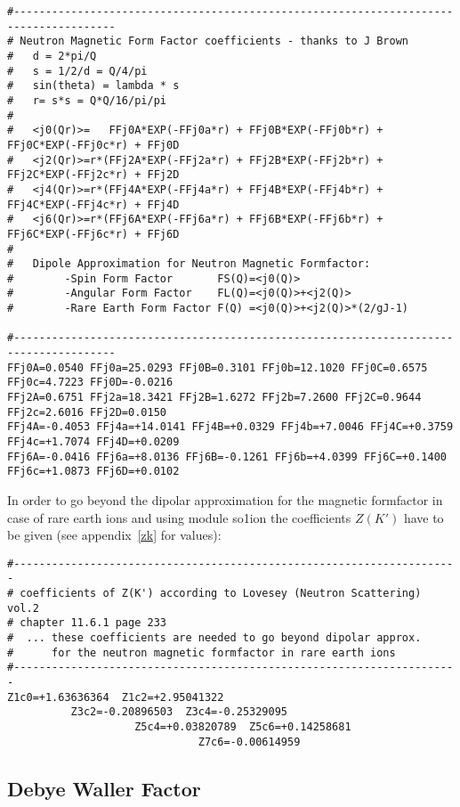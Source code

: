 {\footnotesize
\begin{verbatim}
#--------------------------------------------------------------------------------------
# Neutron Magnetic Form Factor coefficients - thanks to J Brown
#   d = 2*pi/Q      
#   s = 1/2/d = Q/4/pi   
#   sin(theta) = lambda * s
#   r= s*s = Q*Q/16/pi/pi
#
#   <j0(Qr)>=   FFj0A*EXP(-FFj0a*r) + FFj0B*EXP(-FFj0b*r) + FFj0C*EXP(-FFj0c*r) + FFj0D
#   <j2(Qr)>=r*(FFj2A*EXP(-FFj2a*r) + FFj2B*EXP(-FFj2b*r) + FFj2C*EXP(-FFj2c*r) + FFj2D
#   <j4(Qr)>=r*(FFj4A*EXP(-FFj4a*r) + FFj4B*EXP(-FFj4b*r) + FFj4C*EXP(-FFj4c*r) + FFj4D
#   <j6(Qr)>=r*(FFj6A*EXP(-FFj6a*r) + FFj6B*EXP(-FFj6b*r) + FFj6C*EXP(-FFj6c*r) + FFj6D
#
#   Dipole Approximation for Neutron Magnetic Formfactor:
#        -Spin Form Factor       FS(Q)=<j0(Q)>
#        -Angular Form Factor    FL(Q)=<j0(Q)>+<j2(Q)>
#        -Rare Earth Form Factor F(Q) =<j0(Q)>+<j2(Q)>*(2/gJ-1)

#--------------------------------------------------------------------------------------
FFj0A=0.0540 FFj0a=25.0293 FFj0B=0.3101 FFj0b=12.1020 FFj0C=0.6575 FFj0c=4.7223 FFj0D=-0.0216
FFj2A=0.6751 FFj2a=18.3421 FFj2B=1.6272 FFj2b=7.2600 FFj2C=0.9644 FFj2c=2.6016 FFj2D=0.0150
FFj4A=-0.4053 FFj4a=+14.0141 FFj4B=+0.0329 FFj4b=+7.0046 FFj4C=+0.3759 FFj4c=+1.7074 FFj4D=+0.0209
FFj6A=-0.0416 FFj6a=+8.0136 FFj6B=-0.1261 FFj6b=+4.0399 FFj6C=+0.1400 FFj6c=+1.0873 FFj6D=+0.0102
\end{verbatim}
}
In order to go beyond the dipolar approximation for the magnetic formfactor in case
of rare earth ions and using module {\prg so1ion} the coefficients $Z(K')$ have to
be given (see appendix~\ref{zk} for values):
{\footnotesize
\begin{verbatim}
#----------------------------------------------------------------------
# coefficients of Z(K') according to Lovesey (Neutron Scattering) vol.2
# chapter 11.6.1 page 233
#  ... these coefficients are needed to go beyond dipolar approx.
#      for the neutron magnetic formfactor in rare earth ions
#----------------------------------------------------------------------
Z1c0=+1.63636364  Z1c2=+2.95041322
		  Z3c2=-0.20896503  Z3c4=-0.25329095
				    Z5c4=+0.03820789  Z5c6=+0.14258681
						      Z7c6=-0.00614959
\end{verbatim}
}

\subsection{Debye Waller Factor}

